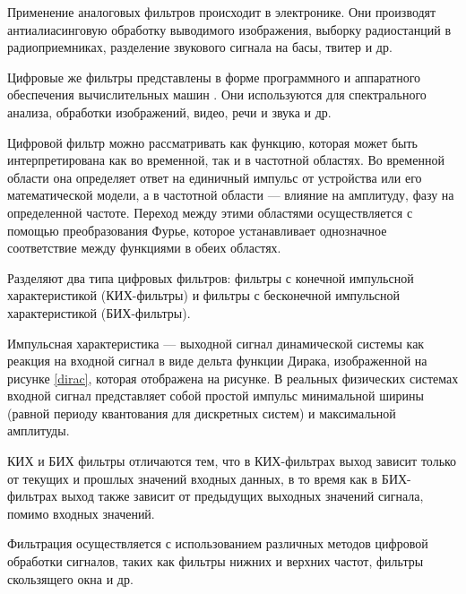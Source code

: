 Применение аналоговых фильтров происходит в электронике. Они производят антиалиасинговую обработку выводимого изображения, выборку радиостанций в радиоприемниках, разделение звукового сигнала на басы, твитер и др.

Цифровые же фильтры представлены в форме программного и аппаратного обеспечения вычислительных машин \cite{bib:preprocessing:1}. Они используются для спектрального анализа, обработки изображений, видео, речи и звука и др.

Цифровой фильтр можно рассматривать как функцию, которая может быть интерпретирована как во временной, так и в частотной областях. Во временной области она определяет ответ на единичный импульс от устройства или его математической модели, а в частотной области — влияние на амплитуду, фазу на определенной частоте. Переход между этими областями осуществляется с помощью преобразования Фурье, которое устанавливает однозначное соответствие между функциями в обеих областях.

Разделяют два типа цифровых фильтров: фильтры с конечной импульсной характеристикой (КИХ-фильтры) и фильтры с бесконечной импульсной характеристикой (БИХ-фильтры).

Импульсная характеристика — выходной сигнал динамической системы как реакция на входной сигнал в виде дельта функции Дирака, изображенной на рисунке \ref{dirac}, которая отображена на рисунке. В реальных физических системах входной сигнал   представляет   собой   простой   импульс минимальной ширины (равной периоду квантования для дискретных систем) и максимальной амплитуды.


КИХ и БИХ фильтры отличаются тем, что в КИХ-фильтрах выход зависит только от текущих и прошлых значений входных данных, в то время как в БИХ-фильтрах выход также зависит от предыдущих выходных значений сигнала, помимо входных значений.

Фильтрация осуществляется с использованием различных методов цифровой обработки сигналов, таких как фильтры нижних и верхних частот, фильтры скользящего окна и др.
